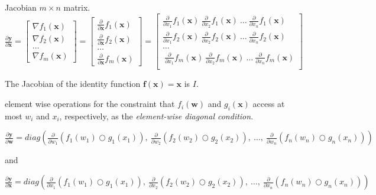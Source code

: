 \documentclass[11pt]{article}
\begin{document}
Jacobian $m \times n$ matrix. $
\frac{\partial \mathbf{y}}{\partial \mathbf{x}} = \begin{bmatrix}
\nabla f_1(\mathbf{x}) \\
\nabla f_2(\mathbf{x})\\
\ldots\\
\nabla f_m(\mathbf{x})
\end{bmatrix} = \begin{bmatrix}
\frac{\partial}{\partial \mathbf{x}} f_1(\mathbf{x}) \\
\frac{\partial}{\partial \mathbf{x}} f_2(\mathbf{x})\\
\ldots\\
\frac{\partial}{\partial \mathbf{x}} f_m(\mathbf{x})
\end{bmatrix} = \begin{bmatrix}
\frac{\partial}{\partial {x_1}} f_1(\mathbf{x})~ \frac{\partial}{\partial {x_2}} f_1(\mathbf{x}) ~\ldots~ \frac{\partial}{\partial {x_n}} f_1(\mathbf{x}) \\
\frac{\partial}{\partial {x_1}} f_2(\mathbf{x})~ \frac{\partial}{\partial {x_2}} f_2(\mathbf{x}) ~\ldots~ \frac{\partial}{\partial {x_n}} f_2(\mathbf{x}) \\
\ldots\\
~\frac{\partial}{\partial {x_1}} f_m(\mathbf{x})~ \frac{\partial}{\partial {x_2}} f_m(\mathbf{x}) ~\ldots~ \frac{\partial}{\partial {x_n}} f_m(\mathbf{x}) \\
\end{bmatrix}
$

The Jacobian of the identity function $\mathbf{f(x)} = \mathbf{x}$ is $I$.

element wise operations for the constraint that $f_i(\mathbf{w})$ and $g_i(\mathbf{x})$ access at most $w_i$ and $x_i$, respectively, as the {\em element-wise diagonal condition}.

$\frac{\partial \mathbf{y}}{\partial \mathbf{w}} = diag \left( \frac{\partial}{\partial w_1}(f_{1}(w_1) \bigcirc g_{1}(x_1)),~ \frac{\partial}{\partial w_2}(f_{2}(w_2) \bigcirc g_{2}(x_2)),~ \ldots,~ \frac{\partial}{\partial w_n}(f_{n}(w_n) \bigcirc g_{n}(x_n)) \right)$

and

$\frac{\partial \mathbf{y}}{\partial \mathbf{x}} = diag \left( \frac{\partial}{\partial x_1}(f_{1}(w_1) \bigcirc g_{1}(x_1)),~ \frac{\partial}{\partial x_2}(f_{2}(w_2) \bigcirc g_{2}(x_2)),~ \ldots,~ \frac{\partial}{\partial x_n}(f_{n}(w_n) \bigcirc g_{n}(x_n)) \right)$
\end{document}
